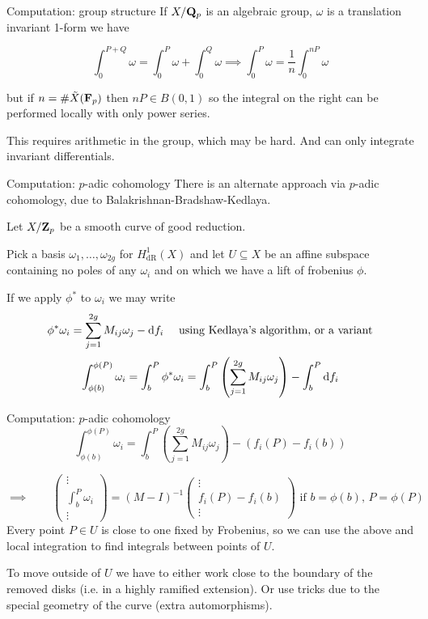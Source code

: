 \begin{frame}{Computation: group structure}
    If $X/\mathbf Q_p$ is an algebraic group, $\omega $ is a translation invariant 1-form we have

    \[\int_0^{P+Q} \omega  = \int_0^P \omega + \int_0^Q \omega \implies \int_0^{P} \omega  = \frac 1n\int_0^{nP} \omega \]

    but if $n = \# \tilde X(\mathbf F_p)$ then $nP \in B(0,1)$ so the integral on the right can be performed locally with only power series.

    \pause
    This requires arithmetic in the group, which may be hard.
    And can only integrate invariant differentials.


\end{frame}

\begin{frame}{Computation: $p$-adic cohomology}
    There is an alternate approach via $p$-adic cohomology, due to Balakrishnan-Bradshaw-Kedlaya.

    Let $X/\mathbf{Z}_p$ be a smooth curve of good reduction.

    Pick a basis $\omega_1, \ldots, \omega_{2g}$ for $H^1_\mathrm{dR}(X)$ and let $U \subseteq X$ be an affine subspace containing no poles of any $\omega_i$ and on which we have a lift of frobenius $\phi$.\pause

    If we apply $\phi^*$ to $\omega_i$ we may write
    \[\phi^* \omega_i = \sum_{j=1}^{2g} M_{ij} \omega_j  - \mathop{}\!\mathrm{d} f_i\quad\text{ using Kedlaya's algorithm, or a variant}\]\pause
    \[\int_{\phi(b)}^{\phi(P)} \omega_i = \int_b^P \phi^* \omega_i = \int_b^P \left(\sum_{j=1}^{2g} M_{ij} \omega_j\right)  - \int_b^P \mathop{}\!\mathrm{d} f_i\]

\end{frame}

\begin{frame}{Computation: $p$-adic cohomology}
    \[\int_{\phi(b)}^{\phi(P)} \omega_i = \int_b^P \left(\sum_{j=1}^{2g} M_{ij} \omega_j\right)  - \left( f_i(P) - f_i(b) \right)\]

    \begin{equation*}
        \implies \qquad
        \left(\begin{smallmatrix} \vdots \\ \int_{b}^{P} \omega_i \\\vdots \end{smallmatrix}\right) = (M - I)^{-1} \left(\begin{smallmatrix}\vdots \\ f_i(P) - f_i(b) \\ \vdots \end{smallmatrix}\right) \text{ if }b = \phi(b),\,P = \phi(P)
    \end{equation*}\pause
    Every point $P\in U$ is close to one fixed by Frobenius, so we can use the above and local integration to find integrals between points of $U$.\pause

    To move outside of $U$ we have to either work close to the boundary of the removed disks (i.e. in a highly ramified extension). Or use tricks due to the special geometry of the curve (extra automorphisms).
\end{frame}

